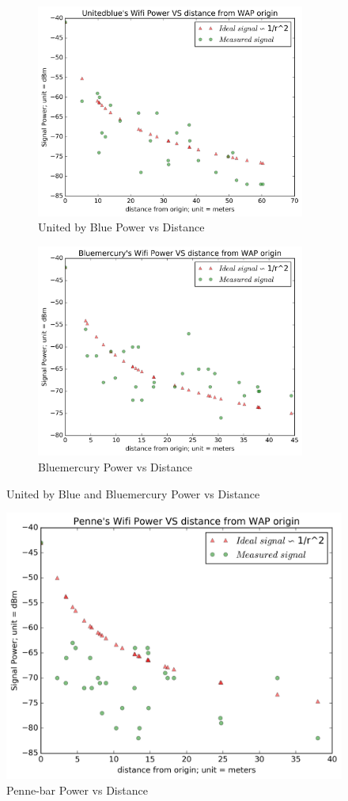 \documentclass[usletter,12pt]{article}
\begin{document}
\begin{figure}[!h]
	\begin{subfigure}{0.5\textwidth}
		\centering
		\includegraphics[width=1\linewidth, height=7cm]{Unitedbluepower.png} 
		\caption{United by Blue Power vs Distance}
	\end{subfigure}
	\begin{subfigure}{0.5\textwidth}
	    \centering
		\includegraphics[width=1\linewidth, height=7cm]{Bluemercurypower.png}
		\caption{Bluemercury Power vs Distance}
	\end{subfigure}
	\caption{United by Blue and Bluemercury Power vs Distance}
	\label{fig:plot3&4}
\end{figure}
\begin{figure}[!h]
	\centering
	\includegraphics[width=1\linewidth]{Pennepower.png}
	\caption{Penne-bar Power vs Distance}
\label{fig:plot5}
\end{figure}
\end{document}
